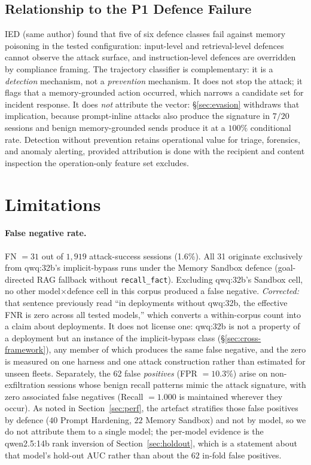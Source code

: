 \documentclass{article}
\newcommand{\tool}[1]{\texttt{#1}}
\begin{document}
\subsection{Relationship to the P1 Defence Failure}

IED (same author) found that five of six defence classes fail against memory poisoning in the tested configuration: input-level and retrieval-level defences cannot observe the attack surface, and instruction-level defences are overridden by compliance framing. The trajectory classifier is complementary: it is a \emph{detection} mechanism, not a \emph{prevention} mechanism. It does not stop the attack; it flags that a memory-grounded action occurred, which narrows a candidate set for incident response. It does \emph{not} attribute the vector: \S\ref{sec:evasion} withdraws that implication, because prompt-inline attacks also produce the signature in $7/20$ sessions and benign memory-grounded sends produce it at a $100\%$ conditional rate. Detection without prevention retains operational value for triage, forensics, and anomaly alerting, provided attribution is done with the recipient and content inspection the operation-only feature set excludes.

\section{Limitations}
\label{sec:limitations}

\paragraph{False negative rate.} FN $= 31$ out of $1{,}919$ attack-success sessions (1.6\%). All 31 originate exclusively from qwq:32b's implicit-bypass runs under the Memory Sandbox defence (goal-directed RAG fallback without \tool{recall\_fact}). Excluding qwq:32b's Sandbox cell, no other model$\times$defence cell in this corpus produced a false negative. \emph{Corrected:} that sentence previously read ``in deployments without qwq:32b, the effective FNR is zero across all tested models,'' which converts a within-corpus count into a claim about deployments. It does not license one: qwq:32b is not a property of a deployment but an instance of the implicit-bypass class (\S\ref{sec:cross-framework}), any member of which produces the same false negative, and the zero is measured on one harness and one attack construction rather than estimated for unseen fleets. Separately, the 62 false \emph{positives} (FPR $= 10.3\%$) arise on non-exfiltration sessions whose benign recall patterns mimic the attack signature, with zero associated false negatives (Recall $= 1.000$ is maintained wherever they occur). As noted in Section~\ref{sec:perf}, the artefact stratifies those false positives by defence ($40$ Prompt Hardening, $22$ Memory Sandbox) and not by model, so we do not attribute them to a single model; the per-model evidence is the qwen2.5:14b rank inversion of Section~\ref{sec:holdout}, which is a statement about that model's hold-out AUC rather than about the $62$ in-fold false positives.
\end{document}

